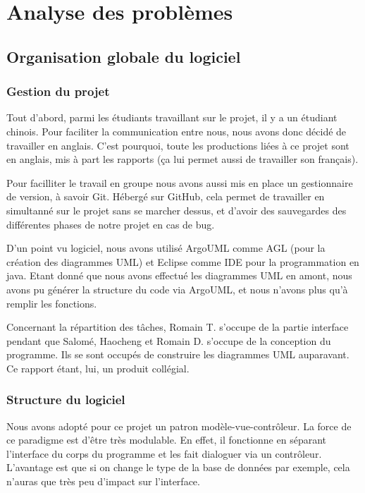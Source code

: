 \documentclass[11pt]{report}
\begin{document}
\chapter{Analyse des problèmes}

	\section{Organisation globale du logiciel}

		\subsection{Gestion du projet}
			Tout d'abord, parmi les étudiants travaillant sur le projet, il y a un étudiant chinois. Pour faciliter la communication entre nous, nous avons donc décidé de travailler en anglais. C'est pourquoi, toute les productions liées à ce projet sont en anglais, mis à part les rapports (ça lui permet aussi de travailler son français). 
			
			Pour facilliter le travail en groupe nous avons aussi mis en place un gestionnaire de version, à savoir Git. Hébergé sur GitHub\up{\copyright}, cela permet de travailler en simultanné sur le projet sans se marcher dessus, et d'avoir des sauvegardes des différentes phases de notre projet en cas de bug.
			
			D'un point vu logiciel, nous avons utilisé ArgoUML comme AGL (pour la création des diagrammes UML) et Eclipse comme IDE pour la programmation en java. Etant donné que nous avons effectué les diagrammes UML en amont, nous avons pu générer la structure du code via ArgoUML, et nous n'avons plus qu'à remplir les fonctions.
			
			Concernant la répartition des tâches, Romain T. s'occupe de la partie interface pendant que Salomé, Haocheng et Romain D. s'occupe de la conception du programme. Ils se sont occupés de construire les diagrammes UML auparavant. Ce rapport étant, lui, un produit collégial.
			
			
		\subsection{Structure du logiciel}
		
			Nous avons adopté pour ce projet un patron modèle-vue-contrôleur. La force de ce paradigme est d'être très modulable. En effet, il fonctionne en séparant l'interface du corps du programme et les fait dialoguer via un contrôleur. L'avantage est que si on change le type de la base de données par exemple, cela n'auras que très peu d'impact sur l'interface. 
			
\end{document}
